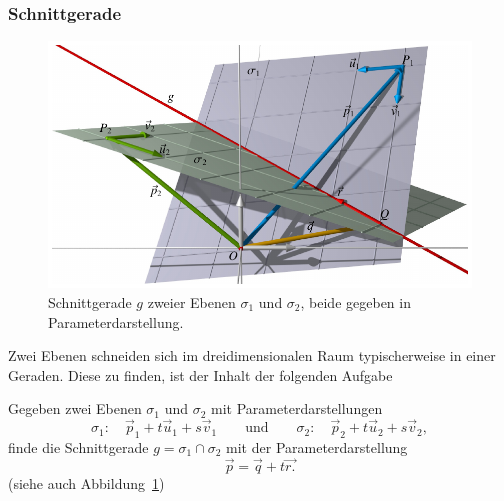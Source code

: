 \subsubsection{Schnittgerade}
\begin{figure}
\centering
\includegraphics{3/images/schnittgerade.pdf}
\caption{Schnittgerade $g$ zweier Ebenen $\sigma_1$ und $\sigma_2$, beide
gegeben in Parameterdarstellung.
\label{skript:affin:schnittgerade}}
\end{figure}
Zwei Ebenen schneiden sich im dreidimensionalen Raum typischerweise in 
einer Geraden.
Diese zu finden, ist der Inhalt der folgenden Aufgabe

\begin{aufgabe}
\label{skript:affin:aufgabe:schnittgerade}
Gegeben zwei Ebenen $\sigma_1$ und $\sigma_2$ mit Parameterdarstellungen
\begin{equation}
\sigma_1:\quad
\vec{p}_1+t\vec{u}_1+s\vec{v}_1
\qquad\text{und}\qquad
\sigma_2:\quad
\vec{p}_2+t\vec{u}_2+s\vec{v}_2,
\label{skript:affin:aufgabe:schnittgerade:gleichungen}
\end{equation}
finde die Schnittgerade $g=\sigma_1\cap\sigma_2$ mit der Parameterdarstellung
\[
\vec{p}
=
\vec{q}
+
t\vec{r.}
\]
(siehe auch Abbildung~\ref{skript:affin:schnittgerade})
\end{aufgabe}

